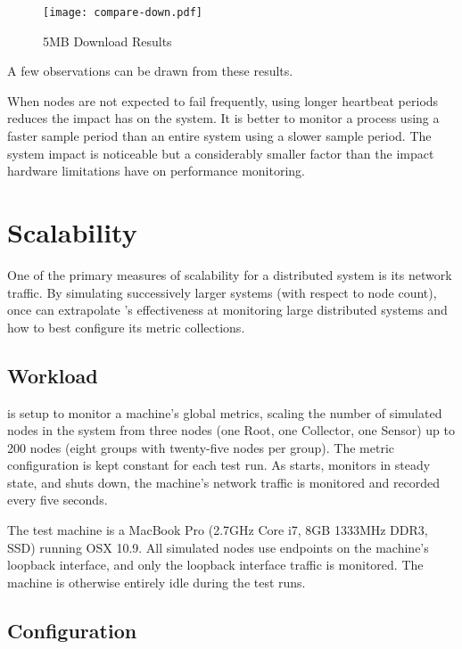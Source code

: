 \begin{figure}[H]
    \centering
    \vspace{-20pt}
    \texttt{[image: compare-down.pdf]}
    \vspace{-50pt}
    \caption{5MB Download Results}
    \label{fig:down5mb_graph}
\end{figure}

A few observations can be drawn from these results.

When nodes are not expected to fail frequently, using longer heartbeat periods reduces the impact \dcamp has on the
system. It is better to monitor a process using a faster sample period than an entire system using a slower sample
period. The \dcamp system impact is noticeable but a considerably smaller factor than the impact hardware limitations
have on performance monitoring.

\section{Scalability}

One of the primary measures of scalability for a distributed system is its network traffic.\cite{zanikolas2005} By
simulating successively larger \dcamp systems (with respect to node count), once can extrapolate \dcamp's effectiveness
at monitoring large distributed systems and how to best configure its metric collections.

\subsection{Workload}

\dcamp is setup to monitor a machine's global metrics, scaling the number of simulated nodes in the \dcamp system from
three nodes (one Root, one Collector, one Sensor) up to 200 nodes (eight groups with twenty-five nodes per group). The
metric configuration is kept constant for each test run. As \dcamp starts, monitors in steady state, and shuts down, the
machine's network traffic is monitored and recorded every five seconds.

The test machine is a MacBook Pro (2.7GHz Core i7, 8GB 1333MHz DDR3, SSD) running OSX 10.9. All simulated \dcamp nodes
use endpoints on the machine's loopback interface, and only the loopback interface traffic is monitored. The machine is
otherwise entirely idle during the test runs.

\subsection{\dcamp Configuration}

